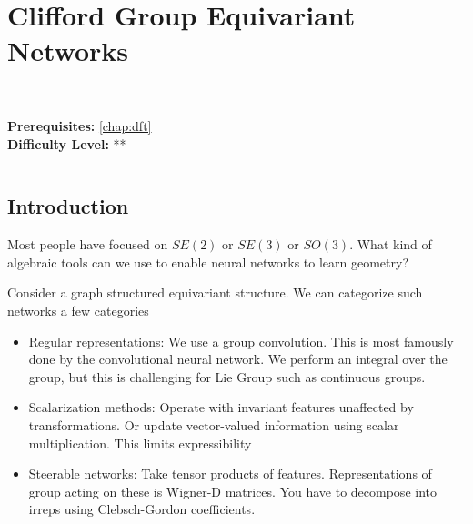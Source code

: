 \documentclass[book.tex]{subfiles}
\begin{document}
\chapter{Clifford Group Equivariant Networks}

\label{chap:deep_onet}
\noindent\rule{11cm}{0.4pt} \\
\textbf{Prerequisites:} \autoref{chap:dft} \\
\textbf{Difficulty Level:} ** \\
\noindent\rule{11cm}{0.4pt}
\vspace{5mm}




\section{Introduction}

Most people have focused on $SE(2)$ or $SE(3)$ or $SO(3)$. What kind of algebraic tools can we use to enable neural networks to learn geometry?

Consider a graph structured equivariant structure. We can categorize such networks a few categories
\begin{itemize}
    \item Regular representations: We use a group convolution. This is most famously done by the convolutional neural network. We perform an integral over the group, but this is challenging for Lie Group such as continuous groups.
    \item Scalarization methods: Operate with invariant features unaffected by transformations. Or update vector-valued information using scalar multiplication. This limits expressibility
    \item Steerable networks: Take tensor products of features. Representations of group acting on these is Wigner-D matrices. You have to decompose into irreps using Clebsch-Gordon coefficients.
\end{itemize}
\end{document}
